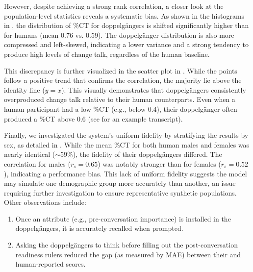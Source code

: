 However, despite achieving a strong rank correlation, a closer look at the population-level statistics reveals a systematic bias. As shown in the histograms in , the distribution of \%CT for doppelgängers is shifted significantly higher than for humans (mean 0.76 vs. 0.59). The doppelgänger distribution is also more compressed and left-skewed, indicating a lower variance and a strong tendency to produce high levels of change talk, regardless of the human baseline.

This discrepancy is further visualized in the scatter plot in . While the points follow a positive trend that confirms the correlation, the majority lie above the identity line ($y=x$). This visually demonstrates that doppelgängers consistently overproduced change talk relative to their human counterparts. Even when a human participant had a low \%CT (e.g., below 0.4), their doppelgänger often produced a \%CT above 0.6 (see  for an example transcript).

Finally, we investigated the system's uniform fidelity by stratifying the results by sex, as detailed in . While the mean \%CT for both human males and females was nearly identical ($\sim$59\%), the fidelity of their doppelgängers differed. The correlation for males ($r_s = 0.65$) was notably stronger than for females ($r_s = 0.52$), indicating a performance bias. This lack of uniform fidelity suggests the model may simulate one demographic group more accurately than another, an issue requiring further investigation to ensure representative synthetic populations. Other observations include:

\begin{enumerate}
    \item Once an attribute (e.g., pre-conversation importance) is installed in the doppelgängers, it is accurately recalled when prompted.
    \item Asking the doppelgängers to think before filling out the post-conversation readiness rulers reduced the gap (as measured by MAE) between their and human-reported scores.
\end{enumerate}



